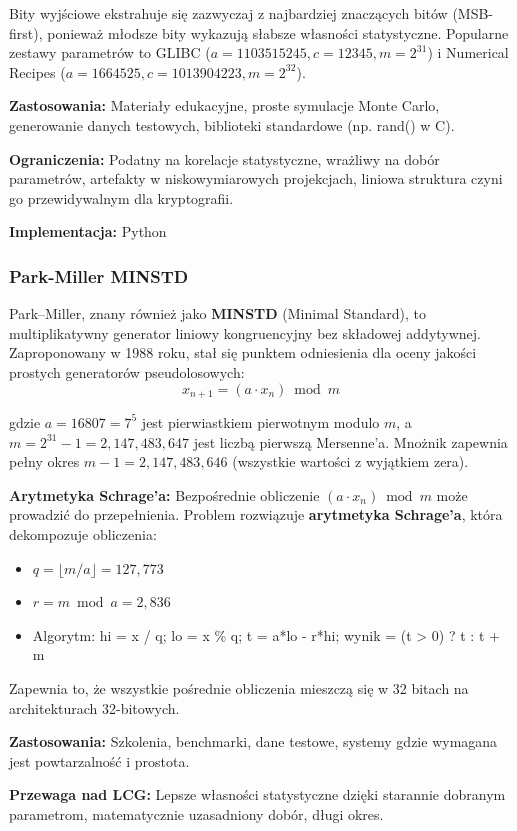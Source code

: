 \documentclass[12pt,a4paper]{article}
\begin{document}
Bity wyjściowe ekstrahuje się zazwyczaj z najbardziej znaczących bitów (MSB-first), ponieważ młodsze bity wykazują słabsze własności statystyczne. Popularne zestawy parametrów to GLIBC ($a=1103515245, c=12345, m=2^{31}$) i Numerical Recipes ($a=1664525, c=1013904223, m=2^{32}$).

\textbf{Zastosowania:} Materiały edukacyjne, proste symulacje Monte Carlo, generowanie danych testowych, biblioteki standardowe (np. rand() w C).

\textbf{Ograniczenia:} Podatny na korelacje statystyczne, wrażliwy na dobór parametrów, artefakty w niskowymiarowych projekcjach, liniowa struktura czyni go przewidywalnym dla kryptografii.

\textbf{Implementacja:} Python

\subsubsection{Park-Miller MINSTD}

Park–Miller, znany również jako \textbf{MINSTD} (Minimal Standard), to multiplikatywny generator liniowy kongruencyjny bez składowej addytywnej. Zaproponowany w 1988 roku, stał się punktem odniesienia dla oceny jakości prostych generatorów pseudolosowych:
$$x_{n+1} = (a \cdot x_n) \bmod m$$

gdzie $a = 16807 = 7^5$ jest pierwiastkiem pierwotnym modulo $m$, a $m = 2^{31} - 1 = 2{,}147{,}483{,}647$ jest liczbą pierwszą Mersenne'a. Mnożnik zapewnia pełny okres $m-1 = 2{,}147{,}483{,}646$ (wszystkie wartości z wyjątkiem zera).

\textbf{Arytmetyka Schrage'a:} Bezpośrednie obliczenie $(a \cdot x_n) \bmod m$ może prowadzić do przepełnienia. Problem rozwiązuje \textbf{arytmetyka Schrage'a}, która dekompozuje obliczenia:
\begin{itemize}
    \item $q = \lfloor m / a \rfloor = 127{,}773$
    \item $r = m \bmod a = 2{,}836$
    \item Algorytm: hi = x / q; lo = x \% q; t = a*lo - r*hi; wynik = (t > 0) ? t : t + m
\end{itemize}

Zapewnia to, że wszystkie pośrednie obliczenia mieszczą się w 32 bitach na architekturach 32-bitowych.

\textbf{Zastosowania:} Szkolenia, benchmarki, dane testowe, systemy gdzie wymagana jest powtarzalność i prostota.

\textbf{Przewaga nad LCG:} Lepsze własności statystyczne dzięki starannie dobranym parametrom, matematycznie uzasadniony dobór, długi okres.
\end{document}
